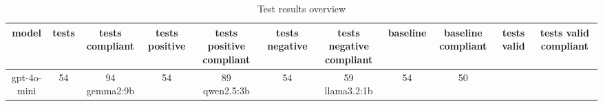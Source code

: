 
  \begin{table}[h!]
  \centering
  \begin{tabular}{|c|c|c|c|c|c|c|c|c|c|c|}
  \hline
  model & tests & tests compliant & tests positive & tests positive compliant & tests negative & tests negative compliant & baseline & baseline compliant & tests valid & tests valid compliant \\
  \hline
  gpt-4o-mini & 54 & 94%
\hline
gemma2:9b & 54 & 89%
\hline
qwen2.5:3b & 54 & 59%
\hline
llama3.2:1b & 54 & 50%
  \end{tabular}
  \caption{Test results overview}
  
  \end{table}
  